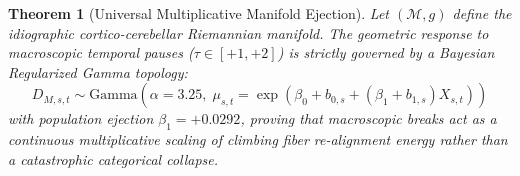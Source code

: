 \documentclass[11pt,twoside,a4paper]{article}
\newtheorem{theorem}{Theorem}
\begin{document}
\begin{theorem}[Universal Multiplicative Manifold Ejection]
Let $(\mathcal{M}, g)$ define the idiographic cortico-cerebellar Riemannian manifold. The geometric response to macroscopic temporal pauses ($\tau \in [+1, +2]$) is strictly governed by a Bayesian Regularized Gamma topology:
\begin{equation}
D_{M,s,t} \sim \text{Gamma}\left(\alpha = 3.25, \; \mu_{s,t} = \exp(\beta_0 + b_{0,s} + (\beta_1 + b_{1,s}) X_{s,t})\right)
\end{equation}
with population ejection $\beta_1 = +0.0292$, proving that macroscopic breaks act as a continuous multiplicative scaling of climbing fiber re-alignment energy rather than a catastrophic categorical collapse.
\end{theorem}
\end{document}
